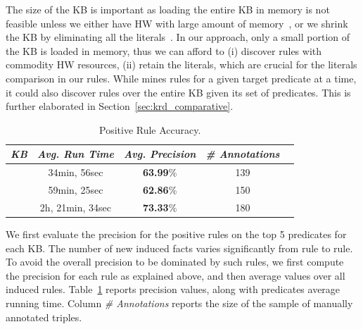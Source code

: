 The size of the KB is important as loading the entire KB in memory is not feasible unless we either have HW with large amount of memory~\cite{Chen:2016,DBLP:conf/sigmod/FaridRIHC16}, or we shrink the KB by eliminating all the literals~\cite{galarraga2015fast}. In our approach, only a small portion of the KB is loaded in memory, thus we can afford to (i) discover rules with commodity HW resources, (ii) retain the literals, which are crucial for the literals comparison in our rules. While \krd mines rules for a given target predicate at a time, it could also discover rules over the entire KB given its set of predicates. This is further elaborated in Section~\ref{sec:krd_comparative}.

\begin{table}[ht]
	\centering
	\caption{\krd Positive Rule Accuracy.}
	\label{tab:pos_rules_acc}
	\begin{small}
	\begin{tabular}{|c|c|c|c|c|}
		\hline
		\hline
		{\it KB}&{\it Avg. Run Time}&{\it Avg. Precision}&{\it \# Annotations} \tabularnewline
		\hline
		\dbpedia & 34min, 56sec & \textbf{63.99}\% & 139\tabularnewline
		\yago 3 &  59min, 25sec & \textbf{62.86}\% & 150\tabularnewline
		\wikidata &  2h, 21min, 34sec & \textbf{73.33}\% & 180\tabularnewline
		\hline
	\end{tabular}
	\end{small}
\end{table}
\vspace{-1ex}


We first evaluate the precision for the positive rules on the top 5 predicates for each KB. 
The number of new induced facts varies significantly from rule to rule.
To avoid the overall precision to be dominated by such rules, we first compute the precision for each rule as explained above, and then average values over all induced rules.
Table~\ref{tab:pos_rules_acc} reports precision values, along with predicates average running time.
Column \emph{\# Annotations}  reports the size of the sample of manually annotated triples.



